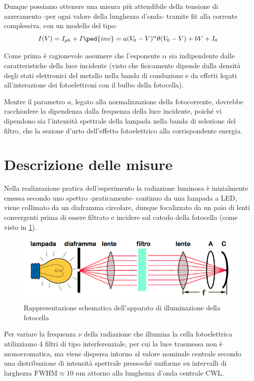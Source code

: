 \documentclass[10pt, a4paper, italian]{article}
\begin{document}
Dunque possiamo ottenere una misura più attendibile della tensione di
azzeramento -per ogni valore della lunghezza d'onda- tramite fit alla corrente
complessiva, con un modello del tipo:
\begin{equation}\label{eq: Ifit}
I(V) = I_{ph} + I\ped{inv} = a(V_0 - V)^\alpha \theta(V_0 - V) + bV + I_0
\end{equation}

Come prima è ragionevole assumere che l'esponente $\alpha$ sia indipendente
dalle caratteristiche della luce incidente (visto che fisicamente dipende
dalla densità degli stati elettronici del metallo nella banda di conduzione e
da effetti legati all'interazione dei fotoelettroni con il bulbo della
fotocella).

Mentre il parametro $a$, legato alla normalizzazione della fotocorrente,
dovrebbe racchiudere la dipendenza dalla frequenza della luce incidente, poiché
vi dipendono sia l'intensità spettrale della lampada nella banda di selezione
del filtro, che la sezione d'urto dell'effetto fotoelettrico alla
corrispondente energia.

\section{Descrizione delle misure}
Nella realizzazione pratica dell'esperimento la radiazione luminosa è
inizialmente emessa secondo uno spettro -praticamente- continuo da una
lampada a LED, viene collimato da un diaframma circolare, dunque focalizzato
da un paio di lenti convergenti prima di essere filtrato e incidere sul catodo
della fotocella (come visto in \cref{fig: lamp}).
\begin{figure}[htbp]
    \centering
	\includegraphics[scale=0.7]{lamp}
    \caption{Rappresentazione schematica dell'apparato di illuminazione della
    fotocella
    \label{fig: lamp}}
\end{figure}

Per variare la frequenza $\nu$ della radiazione che illumina la cella
fotoelettrica utilizziamo 4 filtri di tipo interferenziale, per cui la luce
trasmessa non è monocromatica, ma viene dispersa intorno al valore nominale
centrale secondo una distribuzione di intensità spettrale pressoché uniforme
su intervalli di larghezza $\text{FWHM} \approx 10 \; \si{n\m}$ attorno alla
lunghezza d'onda centrale CWL.
\end{document}
